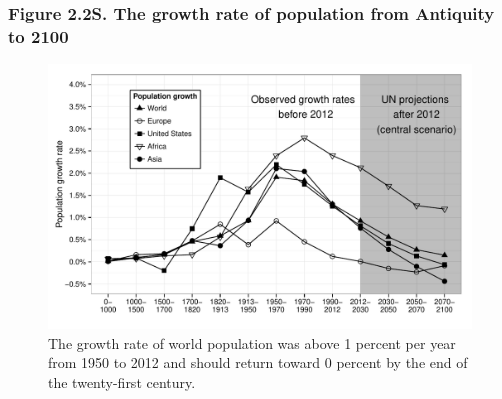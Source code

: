 \documentclass[t]{beamer}\usepackage[]{graphicx}\usepackage[]{color}
\newenvironment{knitrout}{}{} %
\begin{document}
\begin{frame}[label=Figure_2_2S]
\frametitle{Figure 2.2S. The growth rate of population from Antiquity to 2100}
\begin{figure}[t]
\begin{minipage}[b]{\textwidth}
\centering
\begin{knitrout}\footnotesize
{}\color{fgcolor}

{\centering \includegraphics[width=1\linewidth]{figures/bw/Figure_2_2S} 

}



\end{knitrout}
\caption{The growth rate of world population was above 1 percent per year from 1950 to 2012 and should return toward 0 percent by the end of the twenty-first century.}
\end{minipage}
\end{figure}
\end{frame}
\end{document}
